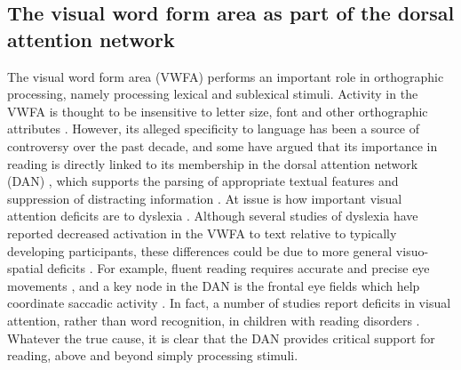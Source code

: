 \subsection{The visual word form area as part of the dorsal attention network} 
The visual word form area (VWFA) performs an important role in orthographic processing, namely processing lexical and sublexical stimuli. Activity in the VWFA is thought to be insensitive to letter size, font and other orthographic attributes \citep{Cohen2002}. However, its alleged specificity to language has been a source of controversy over the past decade, and some have argued that its importance in reading is directly linked to its membership in the dorsal attention network (DAN) \citep{Vogel2012a}, which supports the parsing of appropriate textual features and suppression of distracting information \citep{Corbetta2002}. At issue is how important visual attention deficits are to dyslexia \citep{Vogel2014}. Although several studies of dyslexia have reported decreased activation in the VWFA to text relative to typically developing participants, these differences could be due to more general visuo-spatial deficits  \citep{Richlan2009}. For example, fluent reading requires accurate and precise eye movements \citep{Rayner1978}, and a key node in the DAN is the frontal eye fields which help coordinate saccadic activity \citep{Connolly2002}. In fact, a number of studies report deficits in visual attention, rather than word recognition, in children with reading disorders \citep{Vidyasagar2010}.  Whatever the true cause, it is clear that the DAN provides critical support for reading, above and beyond simply processing stimuli.

